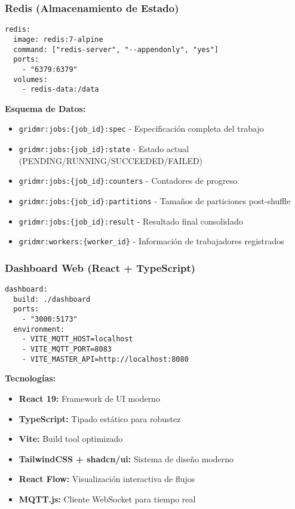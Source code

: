 \subsubsection{Redis (Almacenamiento de Estado)}

\begin{verbatim}
redis:
  image: redis:7-alpine
  command: ["redis-server", "--appendonly", "yes"]
  ports:
    - "6379:6379"
  volumes:
    - redis-data:/data
\end{verbatim}

\textbf{Esquema de Datos:}
\begin{itemize}
    \item \texttt{gridmr:jobs:\{job\_id\}:spec} - Especificación completa del trabajo
    \item \texttt{gridmr:jobs:\{job\_id\}:state} - Estado actual (PENDING/RUNNING/SUCCEEDED/FAILED)
    \item \texttt{gridmr:jobs:\{job\_id\}:counters} - Contadores de progreso
    \item \texttt{gridmr:jobs:\{job\_id\}:partitions} - Tamaños de particiones post-shuffle
    \item \texttt{gridmr:jobs:\{job\_id\}:result} - Resultado final consolidado
    \item \texttt{gridmr:workers:\{worker\_id\}} - Información de trabajadores registrados
\end{itemize}

\subsubsection{Dashboard Web (React + TypeScript)}

\begin{verbatim}
dashboard:
  build: ./dashboard
  ports:
    - "3000:5173"
  environment:
    - VITE_MQTT_HOST=localhost
    - VITE_MQTT_PORT=8083
    - VITE_MASTER_API=http://localhost:8080
\end{verbatim}

\textbf{Tecnologías:}
\begin{itemize}
    \item \textbf{React 19:} Framework de UI moderno
    \item \textbf{TypeScript:} Tipado estático para robustez
    \item \textbf{Vite:} Build tool optimizado
    \item \textbf{TailwindCSS + shadcn/ui:} Sistema de diseño moderno
    \item \textbf{React Flow:} Visualización interactiva de flujos
    \item \textbf{MQTT.js:} Cliente WebSocket para tiempo real
\end{itemize}

